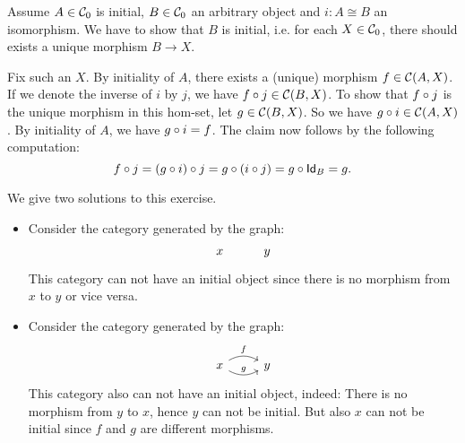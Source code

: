 \begin{solution}\label{sol:initiality_preserved_by_iso}
Assume $A\in \Ob{\CC}$ is initial, $B\in\Ob{\CC}$ an arbitrary object and $i:A\cong B$ an isomorphism. We have to show that $B$ is initial, i.e. for each $X\in\Ob{\CC}$, there should exists a unique morphism $B\to X$.

Fix such an $X$. By initiality of $A$, there exists a (unique) morphism $f\in \CHom{\CC}{A}{X}$. If we denote the inverse of $i$ by $j$, we have $\co{j}{f} \in\CHom{\CC}{B}{X}$. To show that $\co{j}{f}$ is the unique morphism in this hom-set, let $g\in \CHom{\CC}{B}{X}$. So we have $\co{i}{g} \in \CHom{\CC}{A}{X}$. By initiality of $A$, we have $\co{i}{g} = f$. The claim now follows by the following computation:
\[
\co{j}{f} = \co{j}{(\co{i}{g})} = \co{(\co{j}{i})}{g} = \co{\Id[B]}{g} = g.
\]
\end{solution}

\begin{solution}\label{sol:cat-without-initial}
We give two solutions to this exercise.
\begin{itemize}
\item Consider the category generated by the graph: 
\[
\begin{tikzcd}
x & y
\end{tikzcd}
\]
This category can not have an initial object since there is no morphism from $x$ to $y$ or vice versa.
\item Consider the category generated by the graph: 
\[
\begin{tikzcd}
x \arrow[r, bend left, "f"] \arrow[r, bend right, "g"] & y
\end{tikzcd}
\]
This category also can not have an initial object, indeed: There is no morphism from $y$ to $x$, hence $y$ can not be initial. But also $x$ can not be initial since $f$ and $g$ are different morphisms.
\end{itemize}
\end{solution}
